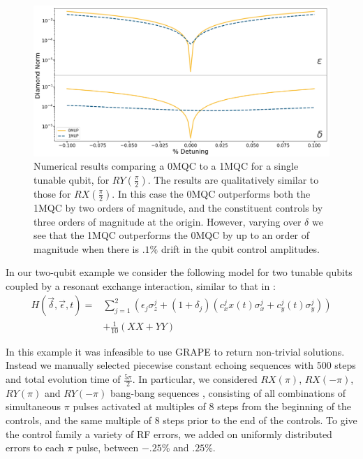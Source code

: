 \documentclass[aps,nofootinbib,pra,notitlepage,twocolumn]{revtex4-1}
\begin{document}
\begin{figure}
  \centering
  \includegraphics[width=\columnwidth]{SQRTY_no_member.png}
  \caption{Numerical results comparing a 0MQC to a 1MQC for a single tunable qubit, for $RY(\frac{\pi}{2})$. The results are qualitatively similar to those for $RX(\frac{\pi}{2})$. In this case the 0MQC outperforms both the 1MQC by two orders of magnitude, and the constituent controls by three orders of magnitude at the origin. However, varying over $\delta$ we see that the 1MQC outperforms the 0MQC by up to an order of magnitude when there is $.1\%$ drift in the qubit control amplitudes.}
  \label{fig:YMQC}
\end{figure}

In our two-qubit example we consider the following model for two tunable qubits coupled by a resonant exchange interaction, similar to that in \cite{McKay2016}:
\begin{equation} \label{eq:2Qham}
\begin{split}
H(\vec{\delta}, \vec{\epsilon}, t) = &\sum_{j=1}^2(\epsilon_j\sigma_z^j + (1 + \delta_j)(c_x^jx(t)\sigma_x^j + c_y^j(t)\sigma_y^j)) \\
&+ \frac{1}{10}(XX + YY)
\end{split}
\end{equation}

In this example it was infeasible to use GRAPE to return non-trivial solutions. Instead we manually selected piecewise constant echoing sequences with 500 steps and total evolution time of $\frac{5\pi}{2}$. In particular, we considered $RX(\pi)$, $RX(-\pi)$, $RY(\pi)$ and $RY(-\pi)$ bang-bang sequences \cite{bangbang}, consisting of all combinations of simultaneous $\pi$ pulses activated at multiples of $8$ steps from the beginning of the controls, and the same multiple of $8$ steps prior to the end of the controls. To give the control family a variety of RF errors, we added on uniformly distributed errors to each $\pi$ pulse, between $-.25$\% and $.25$\%.
\end{document}
